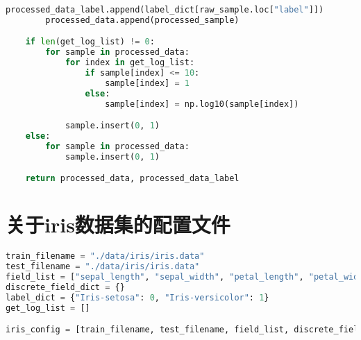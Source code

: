 \documentclass[withoutpreface,bwprint]{cumcmthesis}
\begin{document}
\begin{appendix}
\begin{lstlisting}[language=python]
        processed_data_label.append(label_dict[raw_sample.loc["label"]])
        processed_data.append(processed_sample)

    if len(get_log_list) != 0:
        for sample in processed_data:
            for index in get_log_list:
                if sample[index] <= 10:
                    sample[index] = 1
                else:
                    sample[index] = np.log10(sample[index])

            sample.insert(0, 1)
    else:
        for sample in processed_data:
            sample.insert(0, 1)

    return processed_data, processed_data_label
\end{lstlisting}

\section{关于iris数据集的配置文件}
\begin{lstlisting}[language=python]
train_filename = "./data/iris/iris.data"
test_filename = "./data/iris/iris.data"
field_list = ["sepal_length", "sepal_width", "petal_length", "petal_width"]
discrete_field_dict = {}
label_dict = {"Iris-setosa": 0, "Iris-versicolor": 1}
get_log_list = []

iris_config = [train_filename, test_filename, field_list, discrete_field_dict, label_dict, get_log_list]
\end{lstlisting}


\end{appendix}
\end{document}

